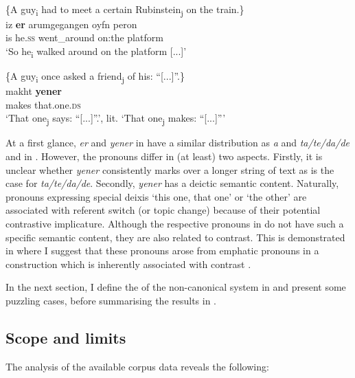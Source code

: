 \documentclass[output=paper
,newtxmath
,modfonts
,nonflat]{langsci/langscibook}
\begin{document}
\ea\label{ex:apel:20}
{ \citep[311]{Prince2006}}\\
\ea
{\-\hspace{0.5cm}\{A guy\textsubscript{i} had to meet a certain Rubinstein\textsubscript{j} on the train.\}}\\
\gll iz \textbf{er} arumgegangen oyfn peron\\
     is he.\textsc{ss} went\_around on:the platform \\
\glt ‘So he\textsubscript{i} walked around on the platform [...]’
\ex

{\{A guy\textsubscript{i} once asked a friend\textsubscript{j} of his: “[...]”.\}}\\
\gll makht \textbf{yener}\\
     makes that.one.\textsc{ds} \\
\glt ‘That one\textsubscript{j} says: “[...]”.’, lit. ‘That one\textsubscript{j} makes: “[...]”’
\z
\z

At a first glance, \textit{er} and \textit{yener} in  have a similar distribution as \textit{a} and \textit{ta/te/da/de} and in . However, the  pronouns differ in (at least) two aspects. Firstly, it is unclear whether \textit{yener} consistently marks  over a longer string of text as is the case for \textit{ta/te/da/de}. Secondly, \textit{yener} has a deictic semantic content. Naturally, pronouns expressing special deixis ‘this one, that one’ or ‘the other’ are associated with referent switch (or topic change) because of their potential contrastive implicature. Although the respective pronouns in  do not have such a specific semantic content, they are also related to contrast. This is demonstrated in  where I suggest that these pronouns arose from emphatic pronouns in a  construction which is inherently associated with contrast \citep[153]{Givon76}.

In the next section, I define the  of the non-canonical  system in  and present some puzzling cases, before summarising the results in . 

\subsection{Scope and limits}\label{sec:apel:3.2}

The analysis of the available corpus data reveals the following: 
\end{document}
